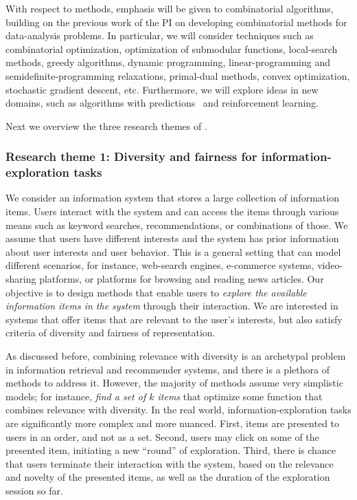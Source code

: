 \documentclass[a4paper,11pt]{article}
\begin{document}
With respect to methods, 
emphasis will be given to combinatorial algorithms,
building on the previous work of the PI 
on developing combinatorial methods for data-analysis problems.
In particular, we will consider techniques such as 
combinatorial optimization, 
optimization of submodular functions, 
local-search methods, 
greedy algorithms, 
dynamic pro\-gram\-ming, 
linear-pro\-gram\-ming and semi\-def\-ini\-te-pro\-gram\-ming relaxations, 
primal-dual methods, convex optimization,
stochastic gradient descent, etc. 
Furthermore, we will explore ideas in new domains, 
such as 
algorithms with predictions~\cite{mitzenmacher2022algorithms} and
reinforcement learning.

Next we overview the three research themes of \acronym.


\subsubsection*{Research theme 1: Diversity and fairness for information-exploration tasks}

\iffalse
\noindent
\hspace{-3mm}\colorbox{verylightmagenta}{
\begin{minipage}{\textwidth}
\ag{do we need a summary in a box?}
\end{minipage}}

\vspace{2mm}
\fi

We consider an information system
that stores a large collection of information items.
Users interact with the system and can access the items through various means 
such as keyword searches, recommendations, or combinations of those.
We assume that users have different interests
and the system has prior information about user interests and user behavior.
This is a general setting that can model different scenarios, 
for instance, web-search engines, e-commerce systems, video-sharing platforms, 
or platforms for browsing and reading news articles.
Our objective is to design methods that enable users to 
\emph{explore the available information items in the system} through their interaction.
We are interested in systems that offer items that are relevant to the user's interests, 
but also satisfy criteria of diversity and fairness of representation.

As discussed before, combining relevance with diversity is an archetypal problem
in information retrieval and recommender systems, 
and there is a plethora of methods to address it. 
However, the majority of methods assume very simplistic models;
for instance, \emph{find a set of $k$ items} 
that optimize some function that combines relevance with diversity. 
In the real world, information-exploration tasks are significantly more complex and more nuanced. 
First, items are presented to users in an order, and not as a set.
Second, users may click on some of the presented item, 
initiating a new ``round'' of exploration. 
Third, there is chance that users terminate their interaction with the system, 
based on the relevance and novelty of the presented items,
as well as the duration of the exploration session so far.
\end{document}
